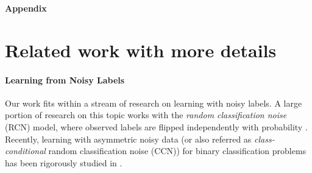 \newpage
\setcounter{section}{0}
\setcounter{figure}{0}
\setcounter{table}{0}
\setcounter{lemma}{0}
\setcounter{theorem}{0}

\makeatletter 
\renewcommand{\thefigure}{A\arabic{figure}}
\setcounter{table}{0}
\renewcommand{\thetable}{A\arabic{table}}
\setcounter{algorithm}{0}
\renewcommand{\thealgorithm}{A\arabic{algorithm}}
\setcounter{definition}{0}
\renewcommand{\thedefinition}{A\arabic{definition}}

\newpage
\appendix
\setcounter{page}{1}
\resetlinenumber

\begin{center}
\vskip 0.15in
\LARGE{\bf Appendix}  
\end{center}



\section*{Related work with more details}

\paragraph{Learning from Noisy Labels}


Our work fits within a stream of research on learning with noisy labels.
A large portion of research on this topic works with the \emph{random classification noise} (RCN) model, where observed labels are flipped independently with probability  
\citep{bylander1994learning,cesa1999sample,cesa2011online,ben2009agnostic}. Recently, learning with asymmetric noisy data (or also referred as \emph{class-conditional} random classification noise (CCN)) for binary classification problems has been rigorously studied in \citep{stempfel2009learning,scott2013classification,natarajan2013learning,scott2015rate,van2015learning,menon2015learning}.

